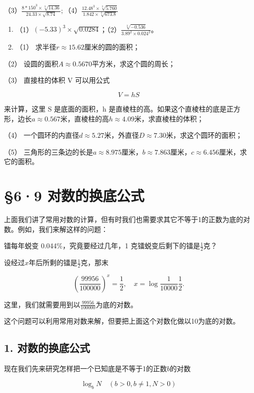 （3）\(\frac{8*150^3\times\sqrt[3]{14.36}}{24.33\times\sqrt{8.74}};\)（4）\(\frac{12.48^3\times\sqrt[3]{5.760}}{1.842\times\sqrt[3]{673.8}}\)

\begin{enumerate}[start=3]
\item
  （1）\((-5.33)^{3} \times \sqrt{0.0284}\)；（2）\(\frac{\sqrt[3]{-0.536}}{3.89^{2} \times 0.024^{2}}\)。
\item
  （1） 求半径\(r \approx 15.62\)厘米的圆的面积；
\end{enumerate}

（2） 设圆的面积\(A \approx 0.5670\)平方米，求这个圆的周长；

（3） 直接柱的体积 V 可以用公式

\[
V = h S
\]

来计算，这里 S 是底面的面积，h
是直棱柱的高。如果这个直棱柱的底是正方形，边长\(a \approx 0.567\)米，直棱柱的高\(h \approx 4.09\)米，求直棱柱的体积；

（4）
一个圆环的内直径\(d \approx 5.27\)米，外直径\(D \approx 7.30\)米，求这个圆环的面积；

（5）
三角形的三条边的长是\(a \approx 8.975\)厘米，\(b \approx 7.863\)厘米，\(c \approx 6.456\)厘米，求它的面积。

\section{§6·9 对数的换底公式}

上面我们讲了常用对数的计算，但有时我们也需要求其它不等于1的正数为底的对数。例如，我们来解这样的问题：

镭每年蜕变 0.044\%，究竟要经过几年，1
克镭蜕变后剩下的镭是\(\frac{1}{2}\)克？

设经过\(x\)年后所剩的镭是\(\frac{1}{2}\)克，那末

\[
\left(\frac{99956}{100000}\right)^{x} = \frac{1}{2}, \quad x = \log \frac{1}{10000} \frac{1}{2}.
\]

这里，我们就需要用到以\(\frac{99956}{100000}\)为底的对数。

这个问题可以利用常用对数来解，但要把上面这个对数化做以10为底的对数。

\subsection{1. 对数的换底公式}

现在我们先来研究怎样把一个已知底是不等于1的正数\(b\)的对数

\[
\log_{b} N \quad (b > 0, b \neq 1, N > 0) \tag {1}
\]

